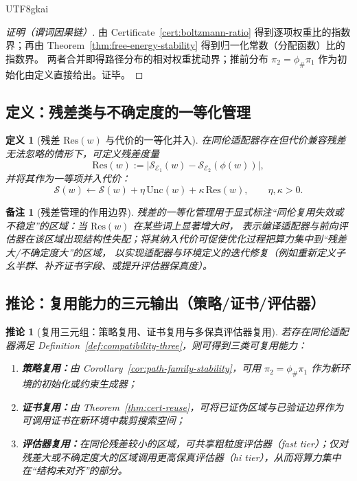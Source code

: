 \documentclass[12pt]{article}
\newtheorem{definition}{定义}[section]
\newtheorem{corollary}{推论}[section]
\newtheorem{remark}{备注}[section]
\begin{document}
\begin{CJK*}{UTF8}{gkai}
\begin{proof}[证明（谓词因果链）]
由 Certificate~\ref{cert:boltzmann-ratio} 得到逐项权重比的指数界；再由 Theorem~\ref{thm:free-energy-stability} 得到归一化常数（分配函数）比的指数界。
两者合并即得路径分布的相对权重扰动界；推前分布 $\pi_2=\phi_{\#}\pi_1$ 作为初始化由定义直接给出。证毕。
\end{proof}

\subsection{定义：残差类与不确定度的一等化管理}

\begin{definition}[残差 $\mathrm{Res}(w)$ 与代价的一等化并入]
\label{def:residual-class}
在同伦适配器存在但代价兼容残差无法忽略的情形下，可定义残差度量
\[
\mathrm{Res}(w):=\bigl|\mathcal{S}_{\mathcal{E}_1}(w)-\mathcal{S}_{\mathcal{E}_2}(\phi(w))\bigr|,
\]
并将其作为一等项并入代价：
\[
\mathcal{S}(w)\leftarrow \mathcal{S}(w)+\eta\,\mathrm{Unc}(w)+\kappa\,\mathrm{Res}(w),
\qquad \eta,\kappa>0.
\]
\end{definition}

\begin{remark}[残差管理的作用边界]
残差的一等化管理用于显式标注“同伦复用失效或不稳定”的区域：当 $\mathrm{Res}(w)$ 在某些词上显著增大时，
表示编译适配器与前向评估器在该区域出现结构性失配；将其纳入代价可促使优化过程把算力集中到“残差大/不确定度大”的区域，
以实现适配器与环境定义的迭代修复（例如重新定义子幺半群、补齐证书字段、或提升评估器保真度）。
\end{remark}

\subsection{推论：复用能力的三元输出（策略/证书/评估器）}

\begin{corollary}[复用三元组：策略复用、证书复用与多保真评估器复用]
\label{cor:triple-reuse}
若存在同伦适配器满足 Definition~\ref{def:compatibility-three}，则可得到三类可复用能力：
\begin{enumerate}
  \item \textbf{策略复用：}由 Corollary~\ref{cor:path-family-stability}，可用 $\pi_2=\phi_{\#}\pi_1$ 作为新环境的初始化或约束生成器；
  \item \textbf{证书复用：}由 Theorem~\ref{thm:cert-reuse}，可将已证伪区域与已验证边界作为可调用证书在新环境中裁剪搜索空间；
  \item \textbf{评估器复用：}在同伦残差较小的区域，可共享粗粒度评估器（fast tier）；仅对残差大或不确定度大的区域调用更高保真评估器（hi tier），从而将算力集中在“结构未对齐”的部分。
\end{enumerate}
\end{corollary}


\end{CJK*}
\end{document}
